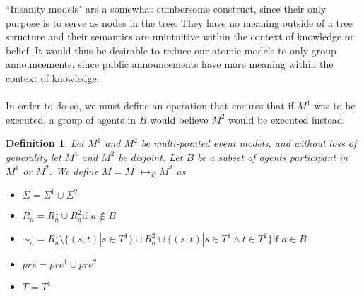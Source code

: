 \documentclass[12pt, a4paper, titlepage]{scrartcl}
\newtheorem{defn}{Definition}[section]
\numberwithin{equation}{section}
\begin{document}
``Insanity models" are a somewhat cumbersome construct, since their only purpose
is to serve as nodes in the tree.
They have no meaning outside of a tree structure and their semantics are
unintuitive within the context of knowledge or belief.
It would thus be desirable to reduce our atomic models to only group
announcements, since public announcements have more meaning within the context of
knowledge.\\
\\
In order to do so, we must define an operation that ensures that if $M^1$ was to
be executed, a group of agents in $B$ would believe $M^2$ would be executed
instead.
\begin{defn} \label{possTwo}
Let $M^1$ and $M^2$ be multi-pointed event models, and without loss of
generality let $M^1$ and $M^2$ be disjoint.
Let $B$ be a subset of agents participant in $M^1$ or $M^2$.
We define $M = M^1 \mapsto_B M^2$ as 
\begin{itemize}
  \item $\Sigma = \Sigma^1 \cup \Sigma^2$
  \item $R_a =
    R^1_a \cup R^2_a \text{if } a \notin B$
	\item $\sim_a =
      R^1_a \setminus \{(s,t) | s \in T^1 \} \cup
      R^2_a \cup
      \{(s,t) | s \in T^1 \land t \in T^2 \}
    \text{if } a \in B$
  \item $pre = pre^1 \cup pre^2$
  \item $T = T^1$
\end{itemize}
\end{defn}
\end{document}
